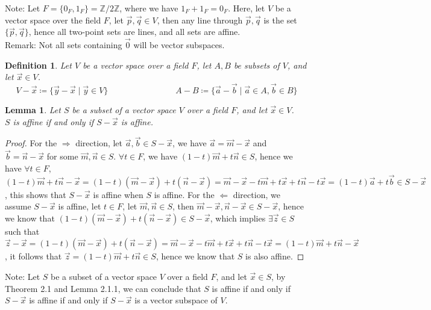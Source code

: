 \documentclass[15pt]{book}
\theoremstyle{break}
\theoremstyle{break}
\newtheorem{lem}{Lemma}[thm]
\newtheorem{defn}{Definition}[corL]
\newcommand{\Z}{\mathbb{Z}}
\newcommand{\note}{\color{red}Note: \color{black}}
\newcommand{\remark}{\color{blue}Remark: \color{black}}
\begin{document}
\note Let $F = \{0_F,1_F\} = \Z/2\Z$, where we have $1_F+1_F=0_F$. Here, let $V$ be a vector space over the field $F$, let $\vec{p},\vec{q}\in V$, then any line through $\vec{p},\vec{q}$ is the set $\{\vec{p},\vec{q}\}$, hence all two-point sets are lines, and all sets are affine. \\

\remark Not all sets containing $\vec{0}$ will be vector subspaces.

\begin{defn}
Let $V$ be a vector space over a field $F$, let $A,B$ be subsets of $V$, and let $\vec{x}\in V$.
$$V-\vec{x} \coloneqq \{\vec{y}-\vec{x} \mid \vec{y} \in V\} \qquad\qquad\qquad\qquad
A-B \coloneqq \{ \vec{a}-\vec{b}\mid \vec{a} \in A,\vec{b} \in B\}$$
\end{defn}

\begin{lem}
Let $S$ be a subset of a vector space $V$ over a field $F$, and let $\vec{x}\in V$.\\ $S$ is affine if and only if $S-\vec{x}$ is affine.
\end{lem}
\begin{proof}
For the $\Rightarrow$ direction, let $\vec{a},\vec{b}\in S-\vec{x}$, we have $\vec{a} = \vec{m}-\vec{x}$ and $\vec{b} =\vec{n}-\vec{x}$ for some $\vec{m},\vec{n} \in S$. $\forall t \in F$, we have $(1-t)\vec{m}+t\vec{n} \in S$, hence we have $\forall t \in F$, $(1-t)\vec{m}+t\vec{n} -\vec{x}=(1-t)(\vec{m}-\vec{x})+t(\vec{n}-\vec{x}) = \vec{m}-\vec{x}-t\vec{m}+t\vec{x}+t\vec{n}-t\vec{x} = (1-t)\vec{a}+t\vec{b} \in S-\vec{x}$, this shows that $S-\vec{x}$ is affine when $S$ is affine. For the $\Leftarrow$ direction, we assume $S-\vec{x}$ is affine, let $t \in F$, let $\vec{m},\vec{n} \in S$, then $\vec{m}-\vec{x},\vec{n}-\vec{x}\in S-\vec{x}$, hence we know that $(1-t)(\vec{m}-\vec{x})+t(\vec{n}-\vec{x}) \in S-\vec{x}$, which implies $\exists\vec{z}\in S$ such that $\vec{z}-\vec{x} = (1-t)(\vec{m}-\vec{x})+t(\vec{n}-\vec{x}) = \vec{m}-\vec{x}-t\vec{m}+t\vec{x}+t\vec{n}-t\vec{x} = (1-t)\vec{m}+t\vec{n}-\vec{x}$, it follows that $\vec{z} = (1-t)\vec{m}+t\vec{n} \in S$, hence we know that $S$ is also affine. 
\end{proof}

\note Let $S$ be a subset of a vector space $V$ over a field $F$, and let $\vec{x}\in S$, by Theorem 2.1 and Lemma 2.1.1, we can conclude that $S$ is affine if and only if $S-\vec{x}$ is affine if and only if $S-\vec{x}$ is a vector subspace of $V$.
\end{document}
